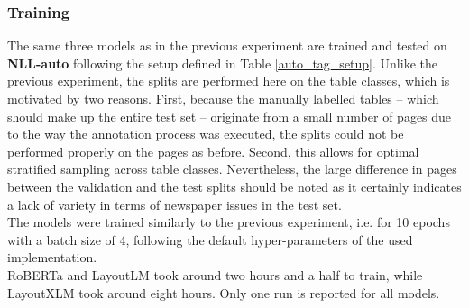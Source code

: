 \subsubsection{Training}
The same three models as in the previous experiment are trained and tested on \textbf{NLL-auto} following the setup defined in Table \ref{auto_tag_setup}. Unlike the previous experiment, the splits are performed here on the table classes, which is motivated by two reasons. First, because the manually labelled tables -- which should make up the entire test set -- originate from a small number of pages due to the way the annotation process was executed, the splits could not be performed properly on the pages as before. Second, this allows for optimal stratified sampling across table classes. Nevertheless, the large difference in pages between the validation and the test splits should be noted as it certainly indicates a lack of variety in terms of newspaper issues in the test set. \\
The models were trained similarly to the previous experiment, i.e. for 10 epochs with a batch size of 4, following the default hyper-parameters of the used implementation. \\

RoBERTa and LayoutLM took around two hours and a half to train, while LayoutXLM took around eight hours. Only one run is reported for all models. 


